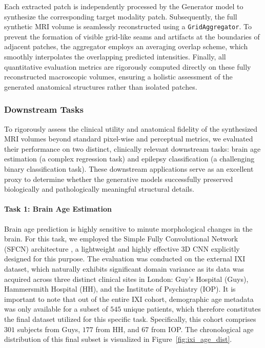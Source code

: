 \documentclass[11pt,a4paper]{article}
\begin{document}
Each extracted patch is independently processed by the Generator model to synthesize the corresponding target modality patch. Subsequently, the full synthetic MRI volume is seamlessly reconstructed using a \texttt{GridAggregator}. To prevent the formation of visible grid-like seams and artifacts at the boundaries of adjacent patches, the aggregator employs an averaging overlap scheme, which smoothly interpolates the overlapping predicted intensities. Finally, all quantitative evaluation metrics are rigorously computed directly on these fully reconstructed macroscopic volumes, ensuring a holistic assessment of the generated anatomical structures rather than isolated patches.

\subsubsection{Downstream Tasks}
To rigorously assess the clinical utility and anatomical fidelity of the synthesized MRI volumes beyond standard pixel-wise and perceptual metrics, we evaluated their performance on two distinct, clinically relevant downstream tasks: brain age estimation (a complex regression task) and epilepsy classification (a challenging binary classification task). These downstream applications serve as an excellent proxy to determine whether the generative models successfully preserved biologically and pathologically meaningful structural details.

\paragraph{Task 1: Brain Age Estimation}
Brain age prediction is highly sensitive to minute morphological changes in the brain. For this task, we employed the Simple Fully Convolutional Network (SFCN) architecture \cite{PENG2021101871}, a lightweight and highly effective 3D CNN explicitly designed for this purpose. The evaluation was conducted on the external IXI dataset, which naturally exhibits significant domain variance as its data was acquired across three distinct clinical sites in London: Guy's Hospital (Guys), Hammersmith Hospital (HH), and the Institute of Psychiatry (IOP). It is important to note that out of the entire IXI cohort, demographic age metadata was only available for a subset of $545$ unique patients, which therefore constitutes the final dataset utilized for this specific task. Specifically, this cohort comprises $301$ subjects from Guys, $177$ from HH, and $67$ from IOP. The chronological age distribution of this final subset is visualized in Figure~\ref{fig:ixi_age_dist}.
\end{document}
